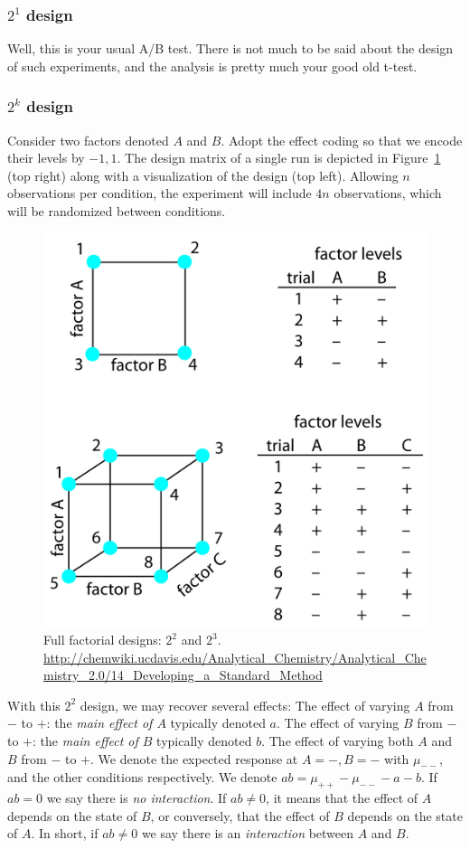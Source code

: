 \subsubsection{$2^1$ design}
Well, this is your usual A/B test. 
There is not much to be said about the design of such experiments, and the analysis is pretty much your good old t-test.




\subsubsection{$2^k$ design}
Consider two factors denoted $A$ and $B$.
Adopt the effect coding so that we encode their levels by $-1,1$.
The design matrix of a single run is depicted in Figure~\ref{fig:full_factorial} (top right) along with a visualization of the design (top left).
Allowing $n$ observations per condition, the experiment will include $4n$ observations, which will be randomized between conditions.
\begin{figure}[ht]
\centering
\includegraphics[width=0.7\linewidth, height=0.3\textheight]{art/full_factorial}
\caption{Full factorial designs: $2^2$ and $2^3$. \newline \url{http://chemwiki.ucdavis.edu/Analytical_Chemistry/Analytical_Chemistry_2.0/14_Developing_a_Standard_Method}}
\label{fig:full_factorial}
\end{figure}
With this $2^2$ design, we may recover several effects:
The effect of varying $A$ from $-$ to $+$: the \emph{main effect of $A$} typically denoted $a$. 
The effect of varying $B$ from $-$ to $+$: the \emph{main effect of $B$} typically denoted $b$.  
The effect of varying both $A$ and $B$ from $-$ to $+$. 
We denote the expected response at $A=-,B=-$ with $\mu_{--}$, and the other conditions respectively.
We denote $ab=\mu_{++}-\mu_{--}-a-b$.
If $ab=0$ we say there is \emph{no interaction}.
If $ab \neq 0$, it means that the effect of $A$ depends on the state of $B$, or conversely, that the effect of $B$ depends on the state of $A$.  In short, if $ab \neq 0$ we say there is an \emph{interaction} between $A$ and $B$. 

